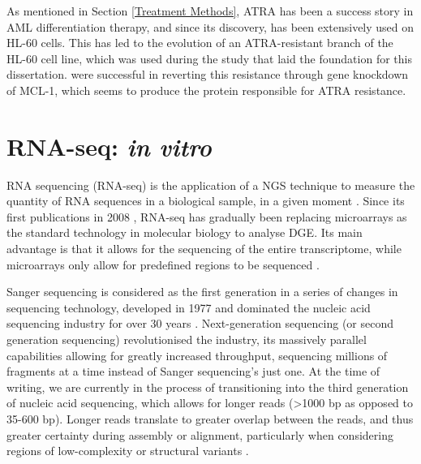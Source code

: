 As mentioned in Section \ref{Treatment Methods}, \ac{ATRA} has been a success story in \ac{AML} differentiation therapy, and since its discovery, has been extensively used on HL-60 cells. This has led to the evolution of an ATRA-resistant branch of the HL-60 cell line, which was used during the study \citep{Gatt2016} that laid the foundation for this dissertation. \cite{fu2005effects} were successful in reverting this resistance through gene knockdown of MCL-1, which seems to produce the protein responsible for \ac{ATRA} resistance.






\section{RNA-seq: \textit{in vitro}}
RNA sequencing (RNA-seq) is the application of a \ac{NGS} technique to measure the quantity of RNA sequences in a biological sample, in a given moment \citep{zhong2009}. Since its first publications in 2008 \citep{nagalakshmi2008transcriptional, lister2008highly, cloonan2008stem}, RNA-seq has gradually been replacing microarrays as the standard technology in molecular biology to analyse \ac{DGE}. Its main advantage is that it allows for the sequencing of the entire transcriptome, while microarrays only allow for predefined regions to be sequenced \citep{rao2019comparison}. 

Sanger sequencing is considered as the first generation in a series of changes in sequencing technology, developed in 1977 and dominated the nucleic acid sequencing industry for over 30 years \citep{behjati2013next}. Next-generation sequencing (or second generation sequencing) revolutionised the industry, its massively parallel capabilities allowing for greatly increased throughput, sequencing millions of fragments at a time instead of Sanger sequencing's just one. At the time of writing, we are currently in the process of transitioning into the third generation of nucleic acid sequencing, which allows for longer reads (>1000 bp as opposed to 35-600 bp). Longer reads translate to greater overlap between the reads, and thus greater certainty during assembly or alignment, particularly when considering regions of low-complexity or structural variants \citep{rhoads2015pacbio}. 

